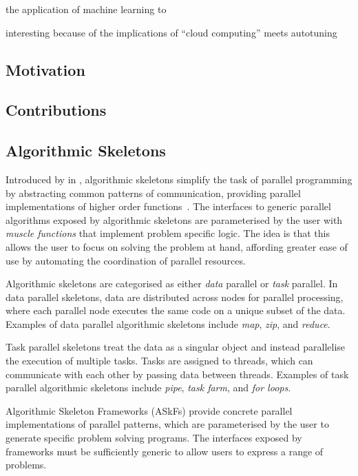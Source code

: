 the application of machine learning to

interesting because of the implications of ``cloud computing'' meets
autotuning


\subsection{Motivation}


\subsection{Contributions}

\subsection{Algorithmic Skeletons}

Introduced by \citeauthor{Cole1989} in \citeyear{Cole1989},
algorithmic skeletons simplify the task of parallel programming by
abstracting common patterns of communication, providing parallel
implementations of higher order functions~\cite{Cole1989}. The
interfaces to generic parallel algorithms exposed by algorithmic
skeletons are parameterised by the user with \emph{muscle functions}
that implement problem specific logic. The idea is that this allows
the user to focus on solving the problem at hand, affording greater
ease of use by automating the coordination of parallel resources.

Algorithmic skeletons are categorised as either \emph{data} parallel
or \emph{task} parallel. In data parallel skeletons, data are
distributed across nodes for parallel processing, where each parallel
node executes the same code on a unique subset of the data. Examples
of data parallel algorithmic skeletons include \emph{map}, \emph{zip},
and \emph{reduce}.

Task parallel skeletons treat the data as a singular object and
instead parallelise the execution of multiple tasks. Tasks are
assigned to threads, which can communicate with each other by passing
data between threads. Examples of task parallel algorithmic skeletons
include \emph{pipe}, \emph{task farm}, and \emph{for loops}.

Algorithmic Skeleton Frameworks (ASkFs) provide concrete parallel
implementations of parallel patterns, which are parameterised by the
user to generate specific problem solving programs. The interfaces
exposed by frameworks must be sufficiently generic to allow users to
express a range of problems.

